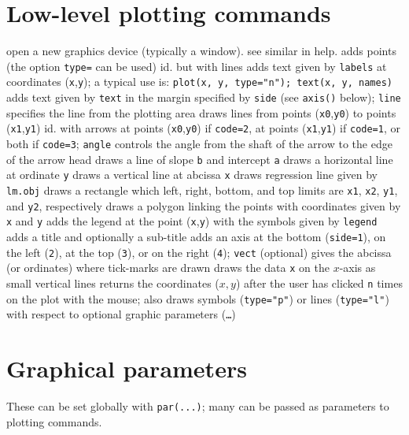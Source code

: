 {\section{Low-level plotting commands}{}
	{open a new graphics device (typically a window). see similar in help.}
	{adds points (the option {\tt type=} can be used)}
	{ id. but with lines}
	{ adds text given by {\tt labels} at
    coordinates ({\tt x},{\tt y}); a typical use is: {\tt plot(x, y, type="n");
        text(x, y, names)}}
	{adds text given by {\tt text} in the margin specified by {\tt side} (see {\tt axis()} below); {\tt line} specifies the line from the plotting area}
	{ draws lines from points ({\tt x0},{\tt y0})
    to points ({\tt x1},{\tt y1})}
	{id. with arrows at points ({\tt x0},{\tt y0}) if {\tt code=2}, at points ({\tt x1},{\tt y1}) if {\tt code=1}, or both if {\tt code=3}; {\tt angle} controls the angle from the shaft of the arrow to the edge of the arrow head}
	{draws a line of slope {\tt b} and intercept {\tt a}}
	{ draws a horizontal line at ordinate {\tt y}}
	{ draws a vertical line at abcissa {\tt x}}
	{ draws regression line given by {\tt lm.obj}}
	{ draws a rectangle which left, right, bottom, and top limits are {\tt x1}, {\tt x2}, {\tt y1}, and {\tt y2}, respectively}
	{draws a polygon linking the points with coordinates given by {\tt x} and {\tt y}}
	{ adds the legend at the point ({\tt x},{\tt y}) with the symbols given by {\tt legend}}
	{ adds a title and optionally a sub-title}
	{adds an axis at the bottom ({\tt side=1}), on the left ({\tt 2}), at the top ({\tt 3}), or on the right ({\tt 4}); {\tt vect} (optional) gives the abcissa (or ordinates) where tick-marks are drawn}
	{draws the data {\tt x} on the $x$-axis as small vertical lines}
	{returns the coordinates ($x,y$) after the
    user has clicked {\tt n} times on the plot with the mouse; also draws
    symbols ({\tt type="p"}) or lines ({\tt type="l"}) with respect to optional
    graphic parameters ({\tt \ldots})}

\section{Graphical parameters}{These can be set globally with
{\tt par(...)}; many can be passed as
parameters to plotting commands.}


}
